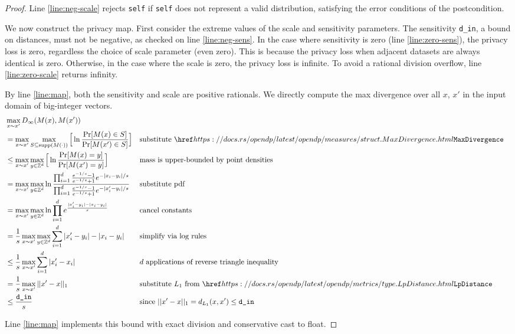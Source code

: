\documentclass{article}
\begin{document}
\begin{proof}
    Line \ref{line:neg-scale} rejects \texttt{self} if \texttt{self} does not represent a valid distribution,
    satisfying the error conditions of the postcondition.

    We now construct the privacy map.
    First consider the extreme values of the scale and sensitivity parameters.
    The sensitivity \texttt{d\_in}, a bound on distances, must not be negative, as checked on line \ref{line:neg-sens}.
    In the case where sensitivity is zero (line \ref{line:zero-sens}), the privacy loss is zero, regardless the choice of scale parameter (even zero).
    This is because the privacy loss when adjacent datasets are always identical is zero.
    Otherwise, in the case where the scale is zero, the privacy loss is infinite.
    To avoid a rational division overflow, line \ref{line:zero-scale} returns infinity.

    By line \ref{line:map}, both the sensitivity and scale are positive rationals.
    We directly compute the max divergence over all $x$, $x'$ in the input domain of big-integer vectors.
    \begin{align}
        &\max_{x \sim x'} D_\infty(M(x), M(x')) \\
        &=\max_{x \sim x'} \max_{S \subseteq \textrm{supp}(M(\cdot))} \Big[\ln \dfrac{\Pr[M(x) \in S]}{\Pr[M(x') \in S]} \Big]
            &&\text{substitute } \rustdoc{measures/struct}{MaxDivergence} \\
        &\leq\max_{x \sim x'} \max_{y \in \mathbb{Z}^d} \Big[\ln \dfrac{\Pr[M(x) = y]}{\Pr[M(x') = y]} \Big] 
            &&\text{mass is upper-bounded by point densities}\\
        &=\max_{x \sim x'} \max_{y \in \mathbb{Z}^d} \ln \dfrac{\prod_{i=1}^d \frac{e^{-1/s} - 1}{e^{-1/s} + 1} e^{-|x_i - y_i|/s}}{\prod_{i=1}^d\frac{e^{-1/s} - 1}{e^{-1/s} + 1} e^{-|x'_i-y_i|/s}}
            &&\text{substitute pdf}\\
        &=\max_{x \sim x'} \max_{y \in \mathbb{Z}^d} \ln \prod_{i=1}^d e^{\frac{|x'_i - y_i| - |x_i - y_i|}{s}}
            &&\text{cancel constants} \\
        &=\frac{1}{s}\max_{x \sim x'} \max_{y \in \mathbb{Z}^d} \sum_{i=1}^d|x'_i - y_i| - |x_i - y_i| 
            &&\text{simplify via log rules}\\
        &\leq\frac{1}{s}\max_{x \sim x'} \sum_{i=1}^d|x'_i - x_i|
            &&d \text{ applications of reverse triangle inequality} \\
        &=\frac{1}{s}\max_{x \sim x'}||x' - x||_1
            &&\text{substitute } L_1 \text{ from } \rustdoc{metrics/type}{LpDistance} \\
        &\leq\frac{\texttt{d\_in}}{s}
            &&\text{since } ||x' - x||_1 = d_{L_1}(x, x') \leq \texttt{d\_in} \\
    \end{align}

    Line \ref{line:map} implements this bound with exact division and conservative cast to float.
\end{proof}
 
\end{document}
